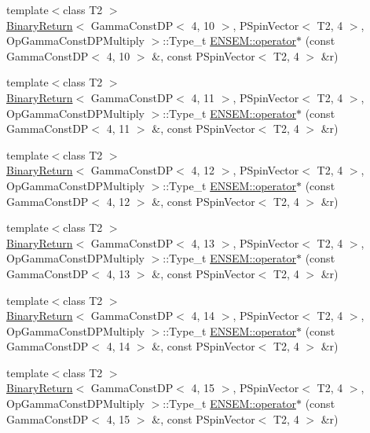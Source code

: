 \begin{DoxyCompactItemize}
\item 
{\footnotesize template$<$class T2 $>$ }\\\mbox{\hyperlink{structBinaryReturn}{Binary\+Return}}$<$ Gamma\+Const\+DP$<$ 4, 10 $>$, P\+Spin\+Vector$<$ T2, 4 $>$, Op\+Gamma\+Const\+D\+P\+Multiply $>$\+::Type\+\_\+t \mbox{\hyperlink{group__primspinvector_gaba02d1dbf98d31e3ed096064681c46aa}{E\+N\+S\+E\+M\+::operator$\ast$}} (const Gamma\+Const\+DP$<$ 4, 10 $>$ \&, const P\+Spin\+Vector$<$ T2, 4 $>$ \&r)
\item 
{\footnotesize template$<$class T2 $>$ }\\\mbox{\hyperlink{structBinaryReturn}{Binary\+Return}}$<$ Gamma\+Const\+DP$<$ 4, 11 $>$, P\+Spin\+Vector$<$ T2, 4 $>$, Op\+Gamma\+Const\+D\+P\+Multiply $>$\+::Type\+\_\+t \mbox{\hyperlink{group__primspinvector_gad1bc0eb5b6f881a32c6fda1e7b14d083}{E\+N\+S\+E\+M\+::operator$\ast$}} (const Gamma\+Const\+DP$<$ 4, 11 $>$ \&, const P\+Spin\+Vector$<$ T2, 4 $>$ \&r)
\item 
{\footnotesize template$<$class T2 $>$ }\\\mbox{\hyperlink{structBinaryReturn}{Binary\+Return}}$<$ Gamma\+Const\+DP$<$ 4, 12 $>$, P\+Spin\+Vector$<$ T2, 4 $>$, Op\+Gamma\+Const\+D\+P\+Multiply $>$\+::Type\+\_\+t \mbox{\hyperlink{group__primspinvector_gab182b2b8559b1382be36d58f251cec0e}{E\+N\+S\+E\+M\+::operator$\ast$}} (const Gamma\+Const\+DP$<$ 4, 12 $>$ \&, const P\+Spin\+Vector$<$ T2, 4 $>$ \&r)
\item 
{\footnotesize template$<$class T2 $>$ }\\\mbox{\hyperlink{structBinaryReturn}{Binary\+Return}}$<$ Gamma\+Const\+DP$<$ 4, 13 $>$, P\+Spin\+Vector$<$ T2, 4 $>$, Op\+Gamma\+Const\+D\+P\+Multiply $>$\+::Type\+\_\+t \mbox{\hyperlink{group__primspinvector_gaa05448d24f9c6526e5785b8c81a604bd}{E\+N\+S\+E\+M\+::operator$\ast$}} (const Gamma\+Const\+DP$<$ 4, 13 $>$ \&, const P\+Spin\+Vector$<$ T2, 4 $>$ \&r)
\item 
{\footnotesize template$<$class T2 $>$ }\\\mbox{\hyperlink{structBinaryReturn}{Binary\+Return}}$<$ Gamma\+Const\+DP$<$ 4, 14 $>$, P\+Spin\+Vector$<$ T2, 4 $>$, Op\+Gamma\+Const\+D\+P\+Multiply $>$\+::Type\+\_\+t \mbox{\hyperlink{group__primspinvector_gad8abbefefdc24a79b3e5e3a161441643}{E\+N\+S\+E\+M\+::operator$\ast$}} (const Gamma\+Const\+DP$<$ 4, 14 $>$ \&, const P\+Spin\+Vector$<$ T2, 4 $>$ \&r)
\item 
{\footnotesize template$<$class T2 $>$ }\\\mbox{\hyperlink{structBinaryReturn}{Binary\+Return}}$<$ Gamma\+Const\+DP$<$ 4, 15 $>$, P\+Spin\+Vector$<$ T2, 4 $>$, Op\+Gamma\+Const\+D\+P\+Multiply $>$\+::Type\+\_\+t \mbox{\hyperlink{group__primspinvector_ga23212ad644650a519a334e7eb30cb99a}{E\+N\+S\+E\+M\+::operator$\ast$}} (const Gamma\+Const\+DP$<$ 4, 15 $>$ \&, const P\+Spin\+Vector$<$ T2, 4 $>$ \&r)

\end{DoxyCompactItemize}
